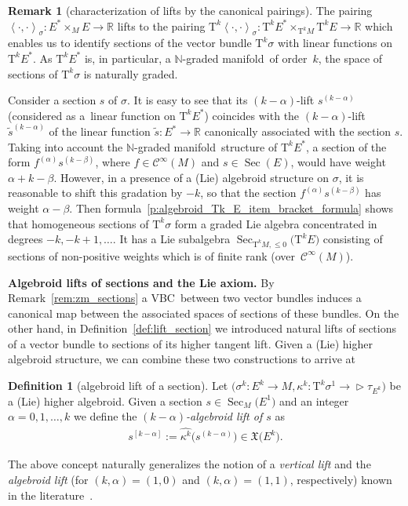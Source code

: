 \documentclass[pdftex]{sigma}
\newcommand{\grB}{{$\N$-graded manifold}}
\newcommand{\ZM}{{VBC}} %
\newcommand{\degree}{{order}}
\newcommand{\R}{\mathbb{R}}
\newcommand{\N}{\mathbb{N}}
\newcommand{\wh}[1]{\widehat{#1}} %
\newcommand{\Sec}{\operatorname{Sec}}
\newcommand{\X}{\mathfrak{X}}
\newcommand{\ra}{\rightarrow}
\newcommand{\TT}[1]{\mathrm{T}^{#1}} %
\newcommand{\Cf}{\mathcal{C}^\infty}
\def\relto{\rightarrow\!\!\vartriangleright} %
\def\<#1>{\left\langle #1\right\rangle}
\numberwithin{equation}{section}
\theoremstyle{definition}
\newtheorem{df}[thm]{Definition}
\newtheorem{rem}[thm]{Remark}
\begin{document}
\begin{rem}[characterization of lifts by the canonical pairings]\label{rem:lifts_pairings} The pairing $\<\cdot, \cdot>_\sigma\colon E^\ast\times_M E\ra \R$ lifts to the pairing $\TT{k} \<\cdot, \cdot>_\sigma\colon \TT{k} E^\ast \times_{\TT{k} M}\TT{k} E \ra \R$ which enables us to identify sections of the vector bundle $\TT{k} \sigma$ with linear functions on $\TT{k} E^\ast$. As $\TT{k} E^\ast$ is, in particular, a \grB\ of \degree\ $k$, the space of sections of $\TT{k} \sigma$ is naturally graded.

Consider a section $s$ of $\sigma$. It is easy to see that its $(k-\alpha)$-lift $s^{(k-\alpha)}$ (considered as a~linear function on $\TT{k} E^\ast$) coincides with the $(k-\alpha)$-lift $\tilde{s}^{(k-\alpha)}$ of the linear function $\tilde{s}\colon E^{\ast}\ra \R$ canonically associated with the section $s$. Taking into account the \grB\ structure of $\TT{k} E^\ast$, a section of the form
$f^{(\alpha)} s^{(k-\beta)}$, where $f\in \Cf(M)$ and $s\in \Sec(E)$, would have weight $\alpha + k- \beta$. However, in a presence of a (Lie) algebroid structure on $\sigma$, it is reasonable to shift this gradation by $-k$, so that the section $f^{(\alpha)} s^{(k-\beta)}$ has weight $\alpha-\beta$. Then formula~\eqref{p:algebroid_Tk_E_item_bracket_formula} shows that homogeneous sections of $\TT{k} \sigma$ form a graded Lie algebra concentrated in degrees $-k, -k+1, \ldots$. It has a Lie subalgebra $\Sec_{\TT{k}M, \leq 0} \big(\TT{k} E\big)$ consisting of sections of non-positive weights which is of finite rank (over~$\Cf(M)$).
\end{rem}

{\bf Algebroid lifts of sections and the Lie axiom.} By Remark~\ref{rem:zm_sections} a \ZM\ between two vector bundles induces a canonical map between the associated spaces of sections of these bundles. On the other hand, in Definition~\ref{def:lift_section} we introduced natural lifts of sections of a vector bundle to sections of its higher tangent lift. Given a (Lie) higher algebroid structure, we can combine these two constructions to arrive at
\begin{df}[algebroid lift of a section]\label{def:alg_lifts_sections}
Let $\big(\sigma^k\colon E^k\ra M,\kappa^k\colon \TT{k}\sigma^1\relto\tau_{E^k}\big)$ be a (Lie) higher algebroid. Given a section $s\in\Sec_M\big(E^1\big)$ and an integer $\alpha=0,1,\hdots,k$ we define the \emph{$(k-\alpha)$-algebroid lift of $s$} as
\begin{gather*} s^{[k-\alpha]}:=\wh{\kappa^k}\big(s^{(k-\alpha)}\big)\in \X\big(E^k\big).\end{gather*}
\end{df}
The above concept naturally generalizes the notion of a \emph{vertical lift} and the \emph{algebroid lift} (for $(k,\alpha)=(1,0)$ and $(k,\alpha)=(1,1)$, respectively) known in the literature~\cite{JG_PU_Algebroids_1999}.
\end{document}
